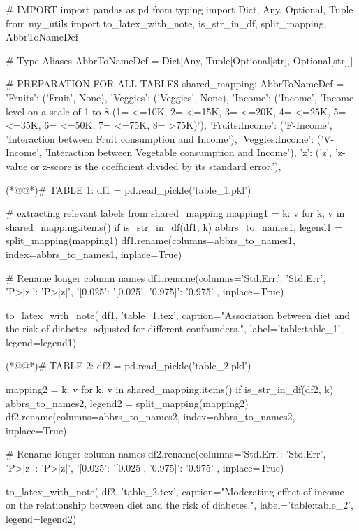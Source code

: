 \documentclass[11pt]{article}
\begin{document}
\begin{python}

# IMPORT
import pandas as pd
from typing import Dict, Any, Optional, Tuple
from my_utils import to_latex_with_note, is_str_in_df, split_mapping, AbbrToNameDef

# Type Aliases
AbbrToNameDef = Dict[Any, Tuple[Optional[str], Optional[str]]]

# PREPARATION FOR ALL TABLES
shared_mapping: AbbrToNameDef = {
    'Fruits': ('Fruit', None),
    'Veggies': ('Veggies', None),
    'Income': ('Income', 'Income level on a scale of 1 to 8 (1= <=10K, 2= <=15K, 3= <=20K, 4= <=25K, 5= <=35K, 6= <=50K, 7= <=75K, 8= >75K)'),
    'Fruits:Income': ('F-Income', 'Interaction between Fruit consumption and Income'),
    'Veggies:Income': ('V-Income', 'Interaction between Vegetable consumption and Income'),
    'z': ('z', 'z-value or z-score is the coefficient divided by its standard error.'),
}

(*@@*)# TABLE 1:
df1 = pd.read_pickle('table_1.pkl')

# extracting relevant labels from shared_mapping
mapping1 = {k: v for k, v in shared_mapping.items() if is_str_in_df(df1, k)}
abbrs_to_names1, legend1 = split_mapping(mapping1)
df1.rename(columns=abbrs_to_names1, index=abbrs_to_names1, inplace=True)

# Rename longer column names
df1.rename(columns={'Std.Err.': 'Std.Err', 'P>|z|': 'P>|z|',
                    '[0.025': '[0.025', '0.975]': '0.975'
                    }, inplace=True)

to_latex_with_note(
    df1,
    'table_1.tex',
    caption="Association between diet and the risk of diabetes, adjusted for different confounders.",
    label='table:table_1',
    legend=legend1)

(*@@*)# TABLE 2:
df2 = pd.read_pickle('table_2.pkl')

mapping2 = {k: v for k, v in shared_mapping.items() if is_str_in_df(df2, k)}
abbrs_to_names2, legend2 = split_mapping(mapping2)
df2.rename(columns=abbrs_to_names2, index=abbrs_to_names2, inplace=True)

# Rename longer column names
df2.rename(columns={'Std.Err.': 'Std.Err', 'P>|z|': 'P>|z|',
                    '[0.025': '[0.025', '0.975]': '0.975'
                    }, inplace=True)

to_latex_with_note(
    df2,
    'table_2.tex',
    caption="Moderating effect of income on the relationship between diet and the risk of diabetes.",
    label='table:table_2',
    legend=legend2)

\end{python}
\end{document}
